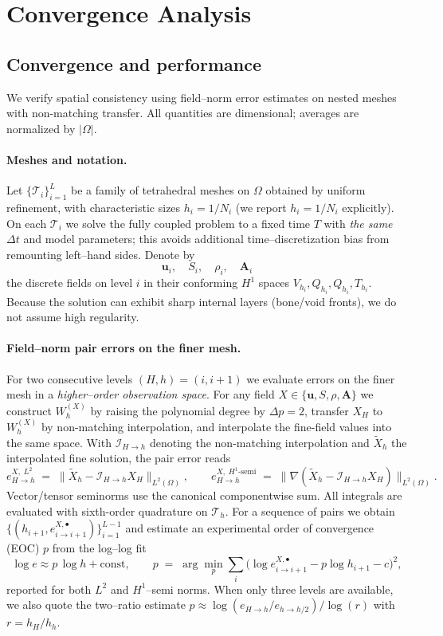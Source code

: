 \appendix
\section{Convergence Analysis}
\label{app:convergence}
\subsection*{Convergence and performance}

We verify spatial consistency using field–norm error estimates on nested meshes with non-matching transfer. All quantities are dimensional; averages are normalized by $|\Omega|$.

\paragraph{Meshes and notation.}
Let $\{\mathcal{T}_i\}_{i=1}^L$ be a family of tetrahedral meshes on $\Omega$ obtained by uniform refinement, with characteristic sizes $h_i=1/N_i$ (we report $h_i=1/N_i$ explicitly). On each $\mathcal{T}_i$ we solve the fully coupled problem to a fixed time $T$ with \emph{the same} $\Delta t$ and model parameters; this avoids additional time–discretization bias from remounting left–hand sides. Denote by
\[
\mathbf{u}_i,\quad S_i,\quad \rho_i,\quad \mathbf{A}_i
\]
the discrete fields on level $i$ in their conforming $H^1$ spaces $V_{h_i},Q_{h_i},Q_{h_i},T_{h_i}$. Because the solution can exhibit sharp internal layers (bone/void fronts), we do not assume high regularity.

\paragraph{Field–norm pair errors on the finer mesh.}
For two consecutive levels $(H,h)=(i,i{+}1)$ we evaluate errors on the finer mesh in a \emph{higher–order observation space}. For any field $X\in\{\mathbf{u},S,\rho,\mathbf{A}\}$ we construct $W_{h}^{(X)}$ by raising the polynomial degree by $\Delta p=2$, transfer $X_H$ to $W_{h}^{(X)}$ by non-matching interpolation, and interpolate the fine-field values into the same space. With $\mathcal{I}_{H\to h}$ denoting the non-matching interpolation and $\widetilde X_h$ the interpolated fine solution, the pair error reads
\[
e_{H\to h}^{X,\;L^2} \;=\; \big\| \widetilde X_h - \mathcal{I}_{H\to h} X_H \big\|_{L^2(\Omega)},
\qquad
e_{H\to h}^{X,\;H^1\text{-semi}} \;=\; \big\| \nabla(\widetilde X_h - \mathcal{I}_{H\to h} X_H) \big\|_{L^2(\Omega)} .
\]
Vector/tensor seminorms use the canonical componentwise sum. All integrals are evaluated with sixth-order quadrature on $\mathcal{T}_h$. For a sequence of pairs we obtain $\{(h_{i+1},e_{i\to i+1}^{X,\bullet})\}_{i=1}^{L-1}$ and estimate an experimental order of convergence (EOC) $p$ from the log–log fit
\[
\log e \approx p\,\log h + \mathrm{const},\qquad
p \;=\; \arg\min_{p} \sum_{i} \big(\log e_{i\to i+1}^{X,\bullet} - p\log h_{i+1} - c\big)^2 ,
\]
reported for both $L^2$ and $H^1$–semi norms. When only three levels are available, we also quote the two–ratio estimate $p \approx \log(e_{H\to h}/e_{h\to h/2})/\log(r)$ with $r=h_H/h_h$.


